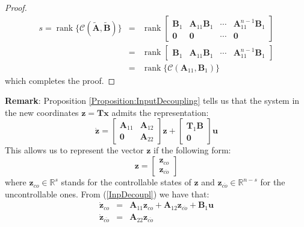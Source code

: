 \documentclass[a4paper,10pt,oneside]{book}
\begin{document}
\begin{proof}
\begin{eqnarray}
 s=\operatorname{rank}\{\mathcal{C}(\tilde{\mathbf{A}},\tilde{\mathbf{B}})\}&=&\operatorname{rank}\left[ {\begin{array}{cccc}
      \mathbf{B}_{1} & \mathbf{A}_{11}\mathbf{B}_{1} & \cdots & \mathbf{A}_{11}^{n-1}\mathbf{B}_{1}\\ 
      \mathbf{0} & \mathbf{0} & \cdots & \mathbf{0}
\end{array} } \right]\\
&=&\operatorname{rank}\left[ {\begin{array}{cccc}
      \mathbf{B}_{1} & \mathbf{A}_{11}\mathbf{B}_{1} & \cdots & \mathbf{A}_{11}^{n-1}\mathbf{B}_{1}
\end{array} } \right]\\
&=&\operatorname{rank}\{\mathcal{C}(\mathbf{A}_{11},\mathbf{B}_{1})\}
\end{eqnarray}
which completes the proof.
\end{proof}
\noindent \textbf{Remark}: Proposition \ref{Proposition:InputDecoupling} tells us that the system in the new coordinates $\mathbf{z}=\mathbf{Tx}$ admits the representation:
\begin{equation}\label{InpDecoupl}
  \dot{\mathbf{z}}=\left[ {\begin{array}{cc}
      \mathbf{A}_{11} & \mathbf{A}_{12} \\ 
      \mathbf{0} & \mathbf{A}_{22}
\end{array} } \right]\mathbf{z}+\left[ {\begin{array}{c}
      \mathbf{T}_{1}\mathbf{B} \\ \mathbf{0}
\end{array} } \right]\mathbf{u}
\end{equation}
This allows us to represent the vector $\mathbf{z}$ if the following form:
\begin{equation}
 \mathbf{z}=\left[ {\begin{array}{c}\mathbf{z}_{co}\\ \mathbf{z}_{\overline{co}} \end{array} } \right]
\end{equation}
where $\mathbf{z}_{co}\in\mathbb{R}^s$ stands for the controllable states of $\mathbf{z}$ and $\mathbf{z}_{\overline{co}}\in\mathbb{R}^{n-s}$ for the uncontrollable ones. From (\ref{InpDecoupl}) we have that:
\begin{eqnarray}
 \dot{\mathbf{z}}_{co}&=&\mathbf{A}_{11}\mathbf{z}_{co}+\mathbf{A}_{12}\mathbf{z}_{\overline{co}}+\mathbf{B}_1\mathbf{u}\\
 \dot{\mathbf{z}}_{\overline{co}} &=& \mathbf{A}_{22}\mathbf{z}_{\overline{co}}
\end{eqnarray}
\end{document}
